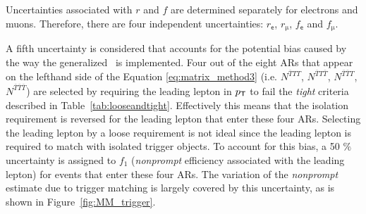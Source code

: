 Uncertainties associated with $r$ and $f$ are determined separately for electrons and muons. Therefore, there are four independent uncertainties: $r_{\textsf{e}}$, $r_{\upmu}$, $f_{\textsf{e}}$ and $f_{\upmu}$. 

A fifth uncertainty is considered that accounts for the potential bias caused by the way the generalized \mm~is implemented. Four out of the eight \acp{AR} that appear on the lefthand side of the Equation \ref{eq:matrix_method3} (i.e. $N^{\overline{T}TT}$, $N^{\overline{T}T\overline{T}}$, $N^{\overline{T}\overline{T}T}$, $N^{\overline{T}\overline{T}\overline{T}}$) are selected by requiring the leading lepton in $p_{\textsf{T}}$ to fail the \emph{tight} criteria described in Table~\ref{tab:looseandtight}. Effectively this means that the isolation requirement is reversed for the leading lepton that enter these four \acp{AR}. Selecting the leading lepton by a loose requirement is not ideal since the leading lepton is required to match with isolated trigger objects. To account for this bias, a 50 $\%$ uncertainty is assigned to $f_1$ (\emph{nonprompt} efficiency associated with the leading lepton) for events that enter these four \acp{AR}. The variation of the \emph{nonprompt} estimate due to trigger matching is largely covered by this uncertainty, as is shown in Figure~\ref{fig:MM_trigger}.

